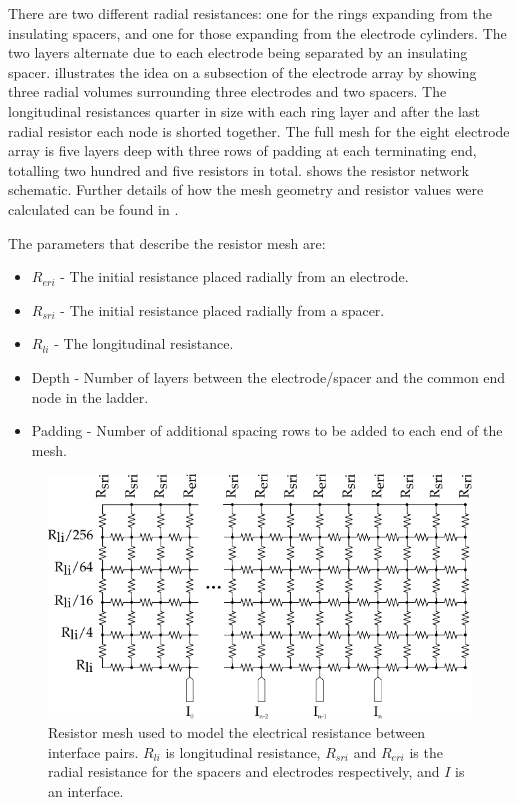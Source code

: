     There are two different radial resistances: one for the rings expanding from the insulating spacers, and one for those expanding from the electrode cylinders.
    The two layers alternate due to each electrode being separated by an insulating spacer.
     illustrates the idea on a subsection of the electrode array by showing three radial volumes surrounding three electrodes and two spacers.
    The longitudinal resistances quarter in size with each ring layer and after the last radial resistor each node is shorted together.
    The full mesh for the eight electrode array is five layers deep with three rows of padding at each terminating end, totalling two hundred and five resistors in total.
     shows the resistor network schematic.
    Further details of how the mesh geometry and resistor values were calculated can be found in \cite{Scott2014}.


    The parameters that describe the resistor mesh are:
    \begin{itemize}
    \item $R_{eri}$ - The initial resistance placed radially from an electrode.
    \item $R_{sri}$ - The initial resistance placed radially from a spacer.
    \item $R_{li}$ - The longitudinal resistance.
    \item Depth - Number of layers between the electrode/spacer and the common end node in the ladder.
    \item Padding - Number of additional spacing rows to be added to each end of the mesh.
    \end{itemize}

    \begin{figure}
      \centering
      \includegraphics{content/pt2/07-InterfaceModel/graphics/resistorMesh}
      \caption{\label{fig:pt2-ResistorMesh}Resistor mesh used to model the electrical resistance between interface pairs. $R_{li}$ is longitudinal resistance, $R_{sri}$ and $R_{eri}$ is the radial resistance for the spacers and electrodes respectively, and $I$ is an interface.}
    \end{figure}


